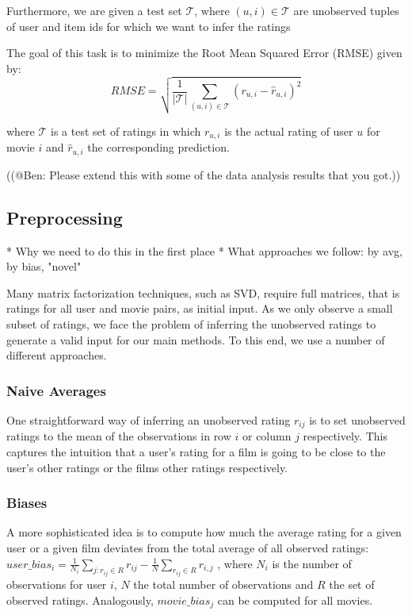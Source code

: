 \documentclass[10pt,conference,compsocconf]{IEEEtran}
\begin{document}
Furthermore, we are given a test set $\mathcal{T}$, where $(u,i) \in \mathcal{T}$ are unobserved tuples of user and item ids for which we want to infer the ratings

The goal of this task is to minimize the Root Mean Squared Error (RMSE) given by:
\begin{equation}
RMSE = \sqrt{\frac{1}{|\mathcal{T}|}\sum_{(u, i) \in \mathcal{T}} (r_{u,i} -\widehat{r}_{u,i})^2}    
\end{equation}

where $\mathcal{T}$ is a test set of ratings in which $r_{u, i}$ is the actual rating of user $u$ for movie $i$ and $\widehat{r}_{u,i}$ the corresponding prediction. 

((@Ben: Please extend this with some of the data analysis results that you got.))

\subsection{Preprocessing}

* Why we need to do this in the first place
* What approaches we follow:
    by avg, by bias, "novel"
    
Many matrix factorization techniques, such as SVD, require full matrices, that is ratings for all user and movie pairs, as initial input. As we only observe a small subset of ratings, we face the problem of inferring the unobserved ratings to generate a valid input for our main methods. To this end, we use a number of different approaches.

\subsubsection{Naive Averages}
One straightforward way of inferring an unobserved rating $r_{ij}$ is to set unobserved ratings to the mean of the observations in row $i$ or column $j$ respectively. This captures the intuition that a user's rating for a film is going to be close to the user's other ratings or the films other ratings respectively.

\subsubsection{Biases}
A more sophisticated idea is to compute how much the average rating for a given user or a given film deviates from the total average of all observed ratings: $user\_bias_i = \frac{1}{N_i} \sum_{j : r_{ij} \in R} r_{ij} - \frac{1}{N} \sum_{r_{ij} \in R} r_{i,j}$ , where $N_i$ is the number of observations for user $i$, $N$ the total number of observations and $R$ the set of observed ratings. Analogously, $movie\_bias_j$ can be computed for all movies. 
\end{document}

